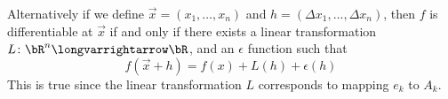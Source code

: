 \documentclass[10pt]{article}
\begin{document}
Alternatively if we define $\vec x=(x_1,\dots,x_n)$ and $h=(\Delta x_1,\dots,\Delta x_n)$, then $f$ is differentiable at $\vec x$ if and only if there exists a linear transformation
$L\colon\bR^n\longvarrightarrow\bR$, and an $\epsilon$ function such that
\[ f(\vec x+h) = f(x) + L(h) + \epsilon(h) \]
This is true since the linear transformation $L$ corresponds to mapping $e_k$ to $A_k$.
\end{document}
